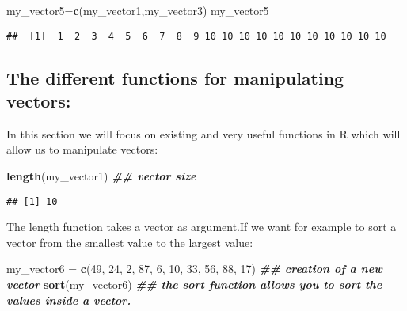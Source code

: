 \documentclass[
]{article}
\newenvironment{Shaded}{\begin{snugshade}}{\end{snugshade}}
\newcommand{\DecValTok}[1]{\textcolor[rgb]{0.00,0.00,0.81}{#1}}
\newcommand{\DocumentationTok}[1]{\textcolor[rgb]{0.56,0.35,0.01}{\textbf{\textit{#1}}}}
\newcommand{\FunctionTok}[1]{\textcolor[rgb]{0.13,0.29,0.53}{\textbf{#1}}}
\newcommand{\NormalTok}[1]{#1}
\newcommand{\OtherTok}[1]{\textcolor[rgb]{0.56,0.35,0.01}{#1}}
\begin{document}
\begin{Shaded}
\begin{Highlighting}[]
\NormalTok{my\_vector5}\OtherTok{=}\FunctionTok{c}\NormalTok{(my\_vector1,my\_vector3)}
\NormalTok{my\_vector5}
\end{Highlighting}
\end{Shaded}

\begin{verbatim}
##  [1]  1  2  3  4  5  6  7  8  9 10 10 10 10 10 10 10 10 10 10 10
\end{verbatim}

\hypertarget{the-different-functions-for-manipulating-vectors}{%
\subsection{The different functions for manipulating
vectors:}\label{the-different-functions-for-manipulating-vectors}}

In this section we will focus on existing and very useful functions in R
which will allow us to manipulate vectors:

\begin{Shaded}
\begin{Highlighting}[]
\FunctionTok{length}\NormalTok{(my\_vector1)  }\DocumentationTok{\#\# vector size}
\end{Highlighting}
\end{Shaded}

\begin{verbatim}
## [1] 10
\end{verbatim}

The length function takes a vector as argument.If we want for example to
sort a vector from the smallest value to the largest value:

\begin{Shaded}
\begin{Highlighting}[]
\NormalTok{my\_vector6 }\OtherTok{=} \FunctionTok{c}\NormalTok{(}\DecValTok{49}\NormalTok{, }\DecValTok{24}\NormalTok{, }\DecValTok{2}\NormalTok{, }\DecValTok{87}\NormalTok{, }\DecValTok{6}\NormalTok{, }\DecValTok{10}\NormalTok{, }\DecValTok{33}\NormalTok{, }\DecValTok{56}\NormalTok{, }\DecValTok{88}\NormalTok{, }\DecValTok{17}\NormalTok{) }\DocumentationTok{\#\# creation of a new vector}
\FunctionTok{sort}\NormalTok{(my\_vector6) }\DocumentationTok{\#\# the sort function allows you to sort the values inside a vector.}
\end{Highlighting}
\end{Shaded}
\end{document}
